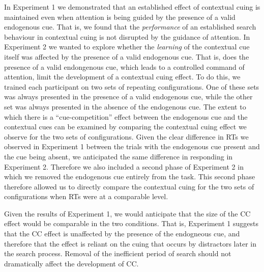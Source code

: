\documentclass[
  man,
  floatsintext,
  longtable,
  nolmodern,
  notxfonts,
  notimes,
  colorlinks=true,linkcolor=blue,citecolor=blue,urlcolor=blue]{apa7}
\begin{document}
In Experiment 1 we demonstrated that an established effect of contextual
cuing is maintained even when attention is being guided by the presence
of a valid endogenous cue. That is, we found that the \emph{performance}
of an established search behaviour in contextual cuing is not disrupted
by the guidance of attention. In Experiment 2 we wanted to explore
whether the \emph{learning} of the contextual cue itself was affected by
the presence of a valid endogenous cue. That is, does the presence of a
valid endongenous cue, which leads to a controlled command of attention,
limit the development of a contextual cuing effect. To do this, we
trained each participant on two sets of repeating configurations. One of
these sets was always presented in the presence of a valid endogenous
cue, while the other set was always presented in the absence of the
endogenous cue. The extent to which there is a ``cue-competition''
effect between the endogenous cue and the contextual cues can be
examined by comparing the contextual cuing effect we observe for the two
sets of configurations. Given the clear difference in RTs we observed in
Experiment 1 between the trials with the endogenous cue present and the
cue being absent, we anticipated the same difference in responding in
Experiment 2. Therefore we also included a second phase of Experiment 2
in which we removed the endogenous cue entirely from the task. This
second phase therefore allowed us to directly compare the contextual
cuing for the two sets of configurations when RTs were at a comparable
level.

Given the results of Experiment 1, we would anticipate that the size of
the CC effect would be comparable in the two conditions. That is,
Experiment 1 suggests that the CC effect is unaffected by the presence
of the endogneous cue, and therefore that the effect is reliant on the
cuing that occurs by distractors later in the search process. Removal of
the inefficient period of search should not dramatically affect the
development of CC.
\end{document}
